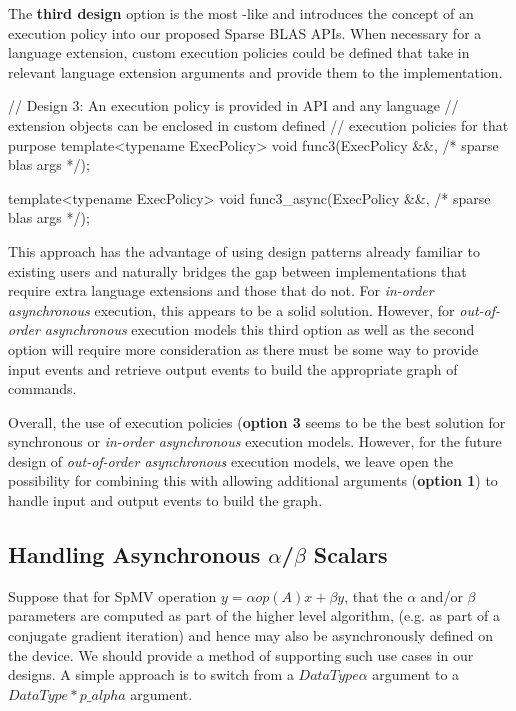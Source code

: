 The \textbf{third design} option is the most \cplusplus-like
and introduces the concept of an execution policy into our proposed Sparse BLAS APIs. When necessary for a language extension, custom execution policies could be defined that take in relevant language extension arguments and provide them to the implementation.
\begin{lstlistings}
// Design 3: An execution policy is provided in API and any language 
//           extension objects can be enclosed in custom defined 
//           execution policies for that purpose
template<typename ExecPolicy>
void func3(ExecPolicy &&, /* sparse blas args */);

template<typename ExecPolicy>
void func3_async(ExecPolicy &&, /* sparse blas args */);
\end{lstlistings}
This approach has the advantage of using design patterns already
familiar to existing \cplusplus users and naturally bridges the gap
between implementations that require extra language extensions and those that do not. For \textit{in-order asynchronous} execution, this appears to be a solid solution.  However, for \textit{out-of-order asynchronous} execution models this third option as well as the second option will require more consideration as there must be some way to provide input events and retrieve output events to build the appropriate graph of commands.




Overall, the use of execution policies (\textbf{option 3} seems to be the best solution for synchronous or \textit{in-order asynchronous} execution models.  However, for the future design of \textit{out-of-order asynchronous} execution models, we leave open the possibility for combining this with allowing additional arguments (\textbf{option 1}) to handle input and output events to build the graph.


\subsection{Handling Asynchronous $\alpha$/$\beta$ Scalars}

Suppose that for SpMV operation $y=\alpha op(A)x + \beta y$, that the $\alpha$ and/or $\beta$ parameters are computed as part of the higher level algorithm, (e.g. as part of a conjugate gradient iteration) and hence may also be asynchronously defined on the device.  We should provide a method of supporting such use cases in our designs.  A simple approach is to switch from a $DataType \alpha$ argument to a $DataType * p\_alpha$ argument.  

